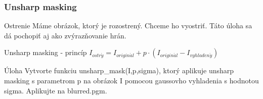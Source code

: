 \documentclass{beamer}
\begin{document}
\begin{frame}
\frametitle{Unsharp masking} 
  \begin{block}{Ostrenie}
    Máme obrázok, ktorý je rozostrený. Chceme ho vyostriť. Táto úloha sa dá pochopiť aj ako zvýrazňovanie hrán.
  \end{block} 
 
  \begin{block}{Unsharp masking - princíp}
    $I_{ostr\acute{y}} = I_{origin\acute{a}l} + p \cdot \left( I_{origin\acute{a}l} - I_{vyhladen\acute{y}} \right)$
  \end{block}
  
  \begin{block}{Úloha}
  Vytvorte funkciu unsharp\_mask(I,p,sigma), ktorý aplikuje unsharp masking s parametrom p na obrázok I pomocou gaussovho vyhladenia s hodnotou sigma. Aplikujte na blurred.pgm.
  \end{block}
\end{frame}
\end{document}
